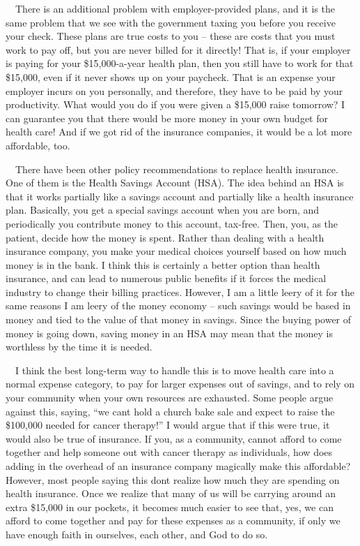 \documentclass[letterpaper]{article}
\begin{document}
{\color{black}
\ \ There is an additional problem with employer-provided plans, and it
is the same problem that we see with the government taxing you before
you receive your check.  These plans are true costs to you – these are
costs that you must work to pay off, but you are never billed for it
directly!  That is, if your employer is paying for your \$15,000-a-year
health plan, then you still have to work for that \$15,000, even if it
never shows up on your paycheck. That is an expense your employer
incurs on you personally, and therefore,
\textcolor[rgb]{0.32941177,0.5529412,0.83137256}{they
}\textcolor[rgb]{0.32941177,0.5529412,0.83137256}{have }to be paid by
your productivity. What would you do if you were given a \$15,000 raise
tomorrow?  I can guarantee you that there would be more money in your
own budget for health care!  And if we got rid of the insurance
companies, it would be a lot more affordable, too.}

{\color{black}
\ \ There have been other policy recommendations to replace health
insurance.  One of them is the Health Savings Account (HSA).  The idea
behind an HSA is that it works partially like a savings account and
partially like a health insurance plan.  Basically, you get a special
savings account when you are born, and periodically you contribute
money to this account, tax-free.  Then, you, as the patient, decide how
the money is spent.  Rather than dealing with a health insurance
company, you make your medical choices yourself based on how much money
is in the bank.  I think this is certainly a better option than health
insurance, and can lead to numerous public benefits if it forces the
medical industry to change their billing practices.  However, I am a
little leery of it for the same reasons I am leery of the money economy
– such savings would be based in money and tied to the value of that
money in savings.  Since the buying power of money is going down,
saving money in an HSA may mean that the money is worthless by the time
it is needed.}

{\color{black}
\ \ I think the best long-term way to handle this is to move health care
into a normal expense category, to pay for larger expenses out of
savings, and to rely on your community when your own resources are
exhausted.  Some people argue against this, saying, “we
can{\textquotesingle}t hold a church bake sale and expect to raise the
\$100,000 needed for cancer therapy!”  I would argue that if this were
true, it would also be true of insurance.  If you, as a community,
cannot afford to come together and help someone out with cancer therapy
as individuals, how does adding in the overhead of an insurance company
magically make this affordable?  However, most people saying this
don{\textquotesingle}t realize how much they are spending on health
insurance.  Once we realize that many of us will be carrying around an
extra \$15,000 in our pockets, it becomes much easier to see that, yes,
we can afford to come together and pay for these expenses as a
community, if only we have enough faith in ourselves, each other, and
God to do so.}
\end{document}
